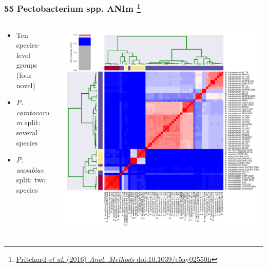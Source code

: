 \begin{frame}
  \frametitle{55 Pectobacterium spp. ANIm
  \footnote{\tiny{\href{http://dx.doi.org/10.1039/c5ay02550h}{Pritchard \textit{et al}. (2016) \textit{Anal. Methods} doi:10.1039/c5ay02550h}}}
  }
  \begin{columns}[T]
    \begin{column}{3cm}
      \begin{itemize}
        \item Ten species-level groups (four novel)
        \item \small{\textit{P. carotovorum} split: several species}
        \item \small{\textit{P. wasabiae} split: two species}
      \end{itemize}
    \end{column}
    \begin{column}{7cm}
      \includegraphics[width=1\textwidth]{images/Pectobacterium_ANIm_percentage_identity}
    \end{column}
  \end{columns}
\end{frame}

